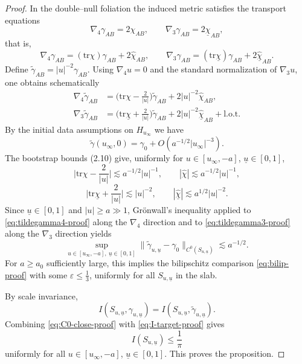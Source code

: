 \documentclass[10pt,a4paper]{amsart}
\newcommand{\tr}{\mbox{tr}}
\newcommand{\ubar}{\underline{u}}
\begin{document}
\begin{proof}
\medskip
\noindent
In the double–null foliation the induced metric satisfies the transport equations
\[
\nabla_{4}\gamma_{AB}=2\chi_{AB},
\qquad
\nabla_{3}\gamma_{AB}=2\underline{\chi}_{AB},
\]
that is,
\[
\nabla_{4}\gamma_{AB}=(\tr\chi)\gamma_{AB}+2\hat\chi_{AB},
\qquad
\nabla_{3}\gamma_{AB}=(\tr\underline{\chi})\gamma_{AB}+2\underline{\hat\chi}_{AB}.
\]
Define $\tilde\gamma_{AB}=|u|^{-2}\gamma_{AB}$. Using $\nabla_{4}u=0$ and the standard normalization of $\nabla_{3}u$, one obtains schematically
\begin{align}
\nabla_{4}\tilde\gamma_{AB}
&=
\Big(\tr\chi-\frac{2}{|u|}\Big)\tilde\gamma_{AB}
+2|u|^{-2}\hat\chi_{AB},
\label{eq:tildegamma4-proof}
\\
\nabla_{3}\tilde\gamma_{AB}
&=
\Big(\tr\underline{\chi}+\frac{2}{|u|}\Big)\tilde\gamma_{AB}
+2|u|^{-2}\underline{\hat\chi}_{AB}
+\text{l.o.t.}
\label{eq:tildegamma3-proof}
\end{align}
By the initial data assumptions on $H_{u_\infty}$ we have
\[
\tilde\gamma(u_\infty,0)=\gamma_{0}+O(a^{-1/2}|u_\infty|^{-3}).
\]
The bootstrap bounds (2.10) give, uniformly for $u\in[u_\infty,-a]$, $\ubar\in[0,1]$,
\[
\Big|\tr\chi-\frac{2}{|u|}\Big|\lesssim a^{-1/2}|u|^{-1},
\qquad
|\hat\chi|\lesssim a^{-1/2}|u|^{-1},
\]
\[
\Big|\tr\underline{\chi}+\frac{2}{|u|}\Big|\lesssim |u|^{-2},
\qquad
|\underline{\hat\chi}|\lesssim a^{1/2}|u|^{-2}.
\]
Since $\ubar\in[0,1]$ and $|u|\ge a\gg1$, Grönwall’s inequality applied to
\eqref{eq:tildegamma4-proof} along the $\nabla_{4}$ direction and to
\eqref{eq:tildegamma3-proof} along the $\nabla_{3}$ direction yields
\begin{equation}\label{eq:C0-close-proof}
\sup_{u\in[u_\infty,-a],\ \ubar\in[0,1]}
\|\tilde\gamma_{u,\ubar}-\gamma_{0}\|_{C^{0}(S_{u,\ubar})}
\lesssim a^{-1/2}.
\end{equation}
For $a\ge a_{0}$ sufficiently large, this implies the bilipschitz comparison
\eqref{eq:bilip-proof} with some $\varepsilon\le \frac13$, uniformly for all
$S_{u,\ubar}$ in the slab.

\medskip
\noindent
By scale invariance,
\[
I(S_{u,\ubar},\gamma_{u,\ubar})
=
I(S_{u,\ubar},\tilde\gamma_{u,\ubar}).
\]
Combining \eqref{eq:C0-close-proof} with \eqref{eq:I-target-proof} gives
\[
I(S_{u,\ubar})\le \frac{1}{\pi}
\]
uniformly for all $u\in[u_\infty,-a]$, $\ubar\in[0,1]$. This proves the proposition.
\end{proof}
\end{document}
